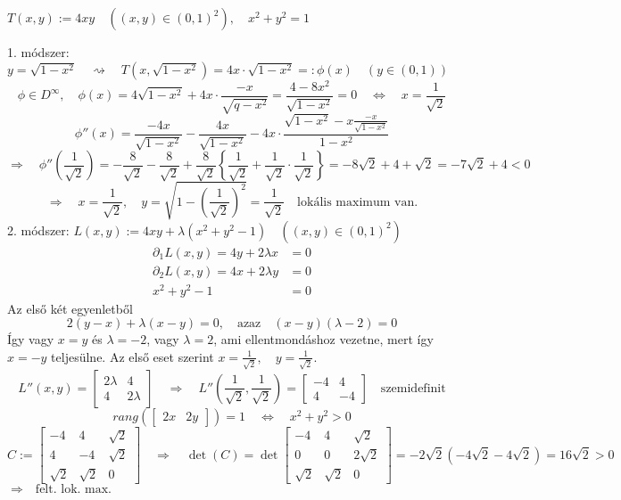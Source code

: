 \documentclass[a4paper,11.5pt]{article}
\begin{document}
	\begin{task}
		$T(x,y):=4xy\quad ((x,y)\in(0,1)^2),\quad x^2+y^2=1$
		
		1. módszer: $y=\sqrt{1-x^2}\quad \rightsquigarrow\quad T(x,\sqrt{1-x^2})=4x\cdot\sqrt{1-x^2}=:\phi(x)\quad (y\in(0,1))$
		\[ \phi\in D^{\infty},\quad \phi(x)=4\sqrt{1-x^2}+4x\cdot\frac{-x}{\sqrt{q-x^2}}=\frac{4-8x^2}{\sqrt{1-x^2}}=0\quad \Leftrightarrow\quad x=\frac{1}{\sqrt{2}} \]
		\[ \phi''(x)=\frac{-4x}{\sqrt{1-x^2}}-\frac{4x}{\sqrt{1-x^2}}-4x\cdot\frac{\sqrt{1-x^2}-x\frac{-x}{\sqrt{1-x^2}}}{1-x^2}\]
		\[\Rightarrow\quad \phi''\left(\frac{1}{\sqrt{2}}\right)=-\frac{8}{\sqrt{2}}-\frac{8}{\sqrt{2}}+\frac{8}{\sqrt{2}}\left\{\frac{1}{\sqrt{2}}+\frac{1}{\sqrt{2}}\cdot\frac{1}{\sqrt{2}}\right\}=-8\sqrt{2}+4+\sqrt{2}=-7\sqrt{2}+4<0\]
		\[ \Rightarrow\quad x=\frac{1}{\sqrt{2}},\quad y=\sqrt{1-\left(\frac{1}{\sqrt{2}}\right)^2}=\frac{1}{\sqrt{2}}\quad \text{lokális maximum van.} \]
		2. módszer: $L(x,y):=4xy+\lambda(x^2+y^2-1)\quad ((x,y)\in(0,1)^2)$
		\begin{align*}
			\partial_1 L(x,y)=4y+2\lambda x&=0\\
			\partial_2L(x,y)=4x+2\lambda y&=0\\
			x^2+y^2-1&=0
		\end{align*}
		Az első két egyenletből
		\[ 2(y-x)+\lambda(x-y)=0,\quad \text{azaz}\quad (x-y)(\lambda-2)=0 \]
		Így vagy $x=y$ és $\lambda=-2$, vagy $\lambda=2$, ami ellentmondáshoz vezetne, mert így $x=-y$ teljesülne. Az első eset szerint $x=\frac{1}{\sqrt{2}},\quad y=\frac{1}{\sqrt{2}}$.
		\[ L''(x,y)=\begin{bmatrix}
			2\lambda&4\\
			4&2\lambda
		\end{bmatrix}\quad \Rightarrow\quad L''\left(\frac{1}{\sqrt{2}},\frac{1}{\sqrt{2}}\right)=\begin{bmatrix}
			-4&4\\
			4&-4
		\end{bmatrix}\quad \text{szemidefinit} \]
		\[ rang(\begin{bmatrix}
			2x&2y
		\end{bmatrix})=1\quad \Leftrightarrow\quad x^2+y^2>0 \]
		\[ C:=\begin{bmatrix}
			-4&4&\sqrt{2}\\
			4&-4&\sqrt{2}\\
			\sqrt{2}&\sqrt{2}&0
		\end{bmatrix}\quad \Rightarrow\quad \det(C)=\det \begin{bmatrix}
		-4&4&\sqrt{2}\\
		0&0&2\sqrt{2}\\
		\sqrt{2}&\sqrt{2}&0
		\end{bmatrix}=-2\sqrt{2}(-4\sqrt{2}-4\sqrt{2})=16\sqrt{2}>0\]
		$ \Rightarrow\quad \text{felt. lok. max.}$
	\end{task}
\end{document}
